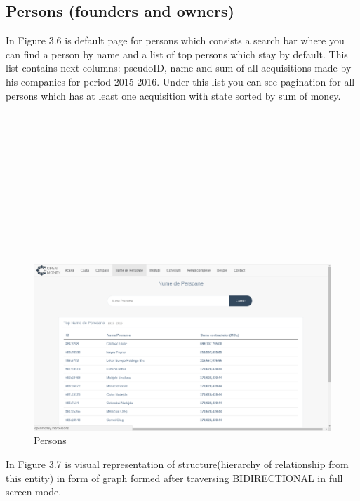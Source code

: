 \documentclass[12pt,a4paper,titlepage]{article}
\begin{document}
	
\subsection{Persons (founders and owners)}

In Figure 3.6 is default page for persons which consists a search bar where you can find a person by name and a list of top persons which stay by default. This list contains next columns: pseudoID, name and sum of all acquisitions made by his companies for period 2015-2016. Under this list you can see pagination for all persons which has at least one acquisition with state sorted by sum of money.\\\\\\\\\\\\\\\\\\\\\\\\

	\begin{figure}[!ht] 
	\renewcommand\thefigure{3.6} %
	\centering 
	\includegraphics[width=17cm]{persons.png} 
	\caption{ Persons }\label{fig4} 
	\end{figure}
	
	In Figure 3.7 is visual representation of structure(hierarchy of relationship from this entity) in form of graph formed after traversing BIDIRECTIONAL in full screen mode.
	
\end{document}
